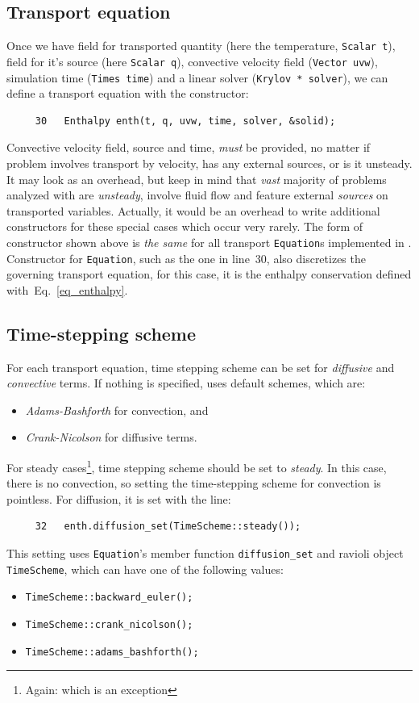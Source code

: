 \subsection{Transport equation}

Once we have field for transported quantity (here the temperature, {\tt Scalar t}), 
field for it's source (here {\tt Scalar q}), convective velocity field 
({\tt Vector uvw}), simulation time ({\tt Times time}) and a linear solver
({\tt Krylov * solver}), we can define a transport equation with the
constructor:
%
{\small \begin{verbatim}
     30   Enthalpy enth(t, q, uvw, time, solver, &solid); 
\end{verbatim}}
% 
Convective velocity field, source and time, {\em must} be provided, no matter
if problem involves transport by velocity, has any external sources, or is it
unsteady. It may look as an overhead, but keep in mind that {\em vast} majority 
of problems analyzed with {\psiboil} are {\em unsteady}, involve fluid flow 
and feature external {\em sources} on transported variables. Actually, it would
be an overhead to write additional constructors for these special cases which
occur very rarely. 
%
The form of constructor shown above is {\em the same} for all transport 
{\tt Equation}s implemented in {\psiboil}. Constructor for {\tt Equation},
such as the one in line~30, also discretizes the governing transport
equation, for this case, it is the enthalpy conservation defined 
with~Eq.~\ref{eq_enthalpy}.

\subsection{Time-stepping scheme}
\label{sub_sec_time_stepping}

For each transport equation, time stepping scheme can be set for {\em diffusive}
and {\em convective} terms. If nothing is specified, {\psiboil} uses  
default schemes, which are:
%
\begin{itemize}
  \item {\em Adams-Bashforth} for convection, and
  \item {\em Crank-Nicolson} for diffusive terms. 
\end{itemize}
%
For steady cases\footnote{Again: which is an exception}, time stepping 
scheme should be set to {\em steady}.
%
In this case, there is no convection, so setting the time-stepping scheme 
for convection is pointless. For diffusion, it is set with the line:
%
{\small \begin{verbatim}
     32   enth.diffusion_set(TimeScheme::steady()); 
\end{verbatim}}
% 
This setting uses {\tt Equation}'s member function {\tt diffusion\_set}
and ravioli object {\tt TimeScheme}, which can have one of the following
values:
%
\begin{itemize}
  \item {\tt TimeScheme::backward\_euler();} 
  \item {\tt TimeScheme::crank\_nicolson();}
  \item {\tt TimeScheme::adams\_bashforth();}
\end{itemize}
%

